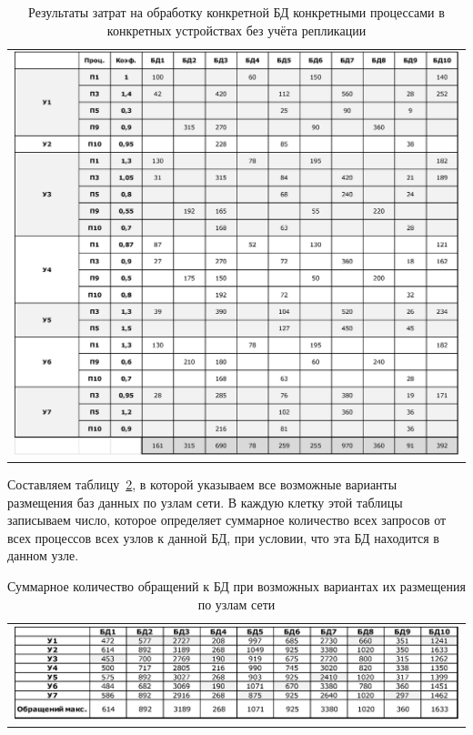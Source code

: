 \begin{table}[h]
\caption{Результаты затрат на обработку конкретной БД конкретными процессами в конкретных устройствах без учёта репликации}
\label{table:results}
 \begin{tabular}{c}
 \includegraphics[width=1\linewidth]{pics/pic8_3_results.eps}
 \end{tabular}
\end{table}

\newpage

Составляем таблицу~\ref{table:sum_req}, в которой указываем все возможные варианты размещения баз данных по узлам сети. В каждую клетку этой таблицы записываем число, которое определяет суммарное количество всех запросов от всех процессов всех узлов к данной БД, при условии, что эта БД находится в данном узле.

\begin{table}[h]
\caption{Суммарное количество обращений к БД при возможных вариантах их размещения по узлам сети}
\label{table:sum_req}
 \begin{tabular}{c}
 \includegraphics[width=1\linewidth]{pics/pic8_4_sum_req.eps}
 \end{tabular}
\end{table}

